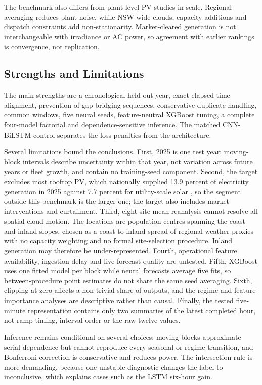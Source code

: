 The benchmark also differs from plant-level PV studies in scale. Regional averaging reduces plant noise, while NSW-wide clouds, capacity additions and dispatch constraints add non-stationarity. Market-cleared generation is not interchangeable with irradiance or AC power, so agreement with earlier rankings is convergence, not replication.

\subsection{Strengths and Limitations}

The main strengths are a chronological held-out year, exact elapsed-time alignment, prevention of gap-bridging sequences, conservative duplicate handling, common windows, five neural seeds, feature-neutral XGBoost tuning, a complete four-model factorial and dependence-sensitive inference. The matched CNN-\allowbreak{}BiLSTM control separates the loss penalties from the architecture.

Several limitations bound the conclusions. First, 2025 is one test year: moving-block intervals describe uncertainty within that year, not variation across future years or fleet growth, and contain no training-seed component. Second, the target excludes most rooftop PV, which nationally supplied 13.9 percent of electricity generation in 2025 against 7.7 percent for utility-scale solar \cite{cec2026clean}, so the segment outside this benchmark is the larger one; the target also includes market interventions and curtailment. Third, eight-site mean reanalysis cannot resolve all spatial cloud motion. The locations are population centres spanning the coast and inland slopes, chosen as a coast-to-inland spread of regional weather proxies with no capacity weighting and no formal site-selection procedure. Inland generation may therefore be under-represented. Fourth, operational feature availability, ingestion delay and live forecast quality are untested. Fifth, XGBoost uses one fitted model per block while neural forecasts average five fits, so between-procedure point estimates do not share the same seed averaging. Sixth, clipping at zero affects a non-trivial share of outputs, and the regime and feature-importance analyses are descriptive rather than causal. Finally, the tested five-minute representation contains only two summaries of the latest completed hour, not ramp timing, interval order or the raw twelve values.

Inference remains conditional on several choices: moving blocks approximate serial dependence but cannot reproduce every seasonal or regime transition, and Bonferroni correction is conservative and reduces power. The intersection rule is more demanding, because one unstable diagnostic changes the label to inconclusive, which explains cases such as the LSTM six-hour gain.

